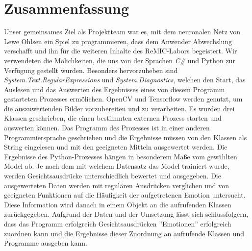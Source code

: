 \documentclass[12pt,a4paper,headinclude,twoside, plainheadsepline, open=right,numbers=noenddot]{scrreprt}
\begin{document}
\section{Zusammenfassung}
Unser gemeinsames Ziel als Projektteam war es, mit dem neuronalen Netz von Lewe Ohlsen \citep{LeweOhlsenGit} ein Spiel zu programmieren, dass dem Anwender Abwechslung verschafft und ihn f\"{u}r die weiteren Inhalte des ReMIC-Labors begeistert.%
Wir verwendeten die M\"{o}lichkeiten, die uns von der Sprachen \textit{C\#} und Python zur Verf\"{u}gung gestellt wurden. Besonders hervorzuheben sind \textit{System.Text.RegularExpressions} und \textit{System.Diagnostics}, welchen den Start, das Auslesen und das Auswerten des Ergebnisses eines von diesem Programm gestarteten Prozesses erm\"{o}lichen. OpenCV und Tensorflow werden genutzt, um die auszuwertenden Bilder vorzubereiten und zu verarbeiten.%
Es wurden drei Klassen geschrieben, die einen bestimmten externen Prozess starten und auswerten k\"{o}nnen. Das Programm des Prozesses ist in einer anderen Programmiersprache geschrieben und die Ergebnisse m\"{u}ssen von den Klassen als String eingelesen und mit den geeigneten Mitteln ausgewertet werden. Die Ergebnisse des Python-Prozesses h\"{a}ngen in besonderem Ma{\ss}e vom gew\"{a}hlten Model ab. Je nach dem mit welchem Datensatz das Model trainiert wurde, werden Gesichtsausdr\"{u}cke unterschiedlich bewertet und ausgegeben. %
Die ausgewerteten Daten werden mit regul\"{a}ren Ausdr\"{u}cken verglichen und von geeigneten Funktionen auf die H\"{a}ufigkeit der aufgetretenen Emotion untersucht. Diese Information wird danach in einem Objekt an die aufrufenden Klassen zur\"{u}ckgegeben.%
\newline
Aufgrund der Daten und der Umsetzung l\"{a}sst sich schlussfolgern, dass das Programm erfolgreich Gesichtsausdr\"{u}cken ''Emotionen'' erfolgreich zuordnen kann und die Ergebnisse dieser Zuordnung an aufrufende Klassen und Programme ausgeben kann.
 




\printbibliography


\appendix

 
\end{document}
